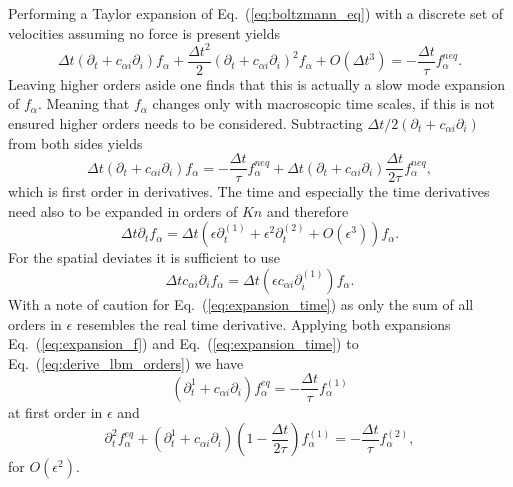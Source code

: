 Performing a Taylor expansion of Eq.~(\ref{eq:boltzmann_eq}) with a discrete set of velocities assuming no force is present yields~\cite{krueger2017}
\begin{equation}\label{eq:Taylor_discret_boltzmann}
    \Delta t (\partial_t + c_{\alpha i}\partial_i)f_{\alpha} + \frac{\Delta t^2}{2}(\partial_t + c_{\alpha i}\partial_i)^2 f_{\alpha} + O(\Delta t^3) = -\frac{\Delta t}{\tau} f_{\alpha}^{neq}.
\end{equation}
Leaving higher orders aside one finds that this is actually a slow mode expansion of $f_{\alpha}$.
Meaning that $f_{\alpha}$ changes only with macroscopic time scales, if this is not ensured higher orders needs to be considered.
Subtracting $\Delta t/2 (\partial_t + c_{\alpha i}\partial_i)$ from both sides yields
\begin{equation}\label{eq:derive_lbm_orders}
    \Delta t (\partial_t + c_{\alpha i}\partial_i)f_{\alpha} = -\frac{\Delta t}{\tau} f_{\alpha}^{neq} + \Delta t (\partial_t + c_{\alpha i}\partial_i)\frac{\Delta t}{2\tau} f^{neq}_{\alpha},
\end{equation}
which is first order in derivatives.
The time and especially the time derivatives need also to be expanded in orders of $Kn$ and therefore
\begin{equation}\label{eq:expansion_time}
    \Delta t \partial_t f_{\alpha} = \Delta t (\epsilon\partial_t^{(1)} + \epsilon^2\partial_t^{(2)} + O(\epsilon^3)) f_{\alpha}.
\end{equation}
For the spatial deviates it is sufficient to use
\begin{equation}\label{eq:expansion_space}
    \Delta t c_{\alpha i}\partial_i f_{\alpha} = \Delta t(\epsilon c_{\alpha i}\partial_i^{(1)}) f_{\alpha}.
\end{equation}
With a note of caution for Eq.~(\ref{eq:expansion_time}) as only the sum of all orders in $\epsilon$ resembles the real time derivative.
Applying both expansions Eq.~(\ref{eq:expansion_f}) and Eq.~(\ref{eq:expansion_time}) to Eq.~(\ref{eq:derive_lbm_orders}) we have
\begin{equation}\label{eq:first_order_esp}
    (\partial_t^{1} + c_{\alpha i}\partial_{i}) f_{\alpha}^{eq} = -\frac{\Delta t}{\tau} f_{\alpha}^{(1)}
\end{equation}
at first order in $\epsilon$ and 
\begin{equation}\label{eq:sec_order_esp}
    \partial_t^{2} f_{\alpha}^{eq} + (\partial_t^{1} + c_{\alpha i}\partial_{i})\left(1 - \frac{\Delta t}{2\tau}\right) f_{\alpha}^{(1)} = -\frac{\Delta t}{\tau} f_{\alpha}^{(2)},
\end{equation}
for $O(\epsilon^2)$.

